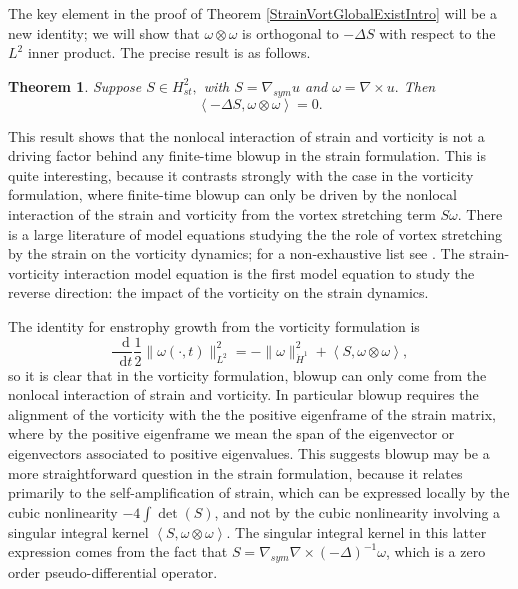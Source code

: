 \documentclass[11pt]{article}
\theoremstyle{plain}
\newtheorem{theorem}{Theorem}[section]
\theoremstyle{remark}
\numberwithin{equation}{section}
\newcommand{\diff}{\mathop{}\!\mathrm{d}}
\begin{document}
The key element in the proof of 
Theorem \ref{StrainVortGlobalExistIntro} will be a new identity; we will show that $\omega\otimes\omega$ is orthogonal to 
$-\Delta S$ with respect to the $L^2$ inner product. The precise result is as follows.
\begin{theorem} \label{StrainVortOrthogonalityIntro}
Suppose $S\in H^2_{st},$ with $S=\nabla_{sym}u$ and $\omega =\nabla \times u.$ Then
\begin{equation}
    \left<-\Delta S, \omega \otimes \omega\right>=0.
\end{equation}
\end{theorem}

This result shows that the nonlocal interaction of strain and vorticity is not a driving factor behind any finite-time blowup in the strain formulation. This is quite interesting, because it contrasts strongly with the case in the vorticity formulation, where finite-time blowup can only be driven by the nonlocal interaction of the strain and vorticity from the vortex stretching term $S\omega$. 
There is a large literature of model equations studying the the role of vortex stretching by the strain on the vorticity dynamics; for a non-exhaustive list see \cites{DeGregorio,ConstantinLaxMajda,Hou2018,HouEtAl,HouLei,JiaStewartSverak,ElgindiJeong,EGM,HQWW}.
The strain-vorticity interaction model equation is the first model equation to study the reverse direction: the impact of the vorticity on the strain dynamics.


The identity for enstrophy growth from the vorticity formulation is
\begin{equation}
    \frac{\diff}{\diff t}
    \frac{1}{2} \|\omega(\cdot,t)\|_{L^2}^2
    =-\|\omega\|_{\dot{H}^1}^2
    +\left<S,\omega\otimes\omega\right>,
\end{equation}
so it is clear that in the vorticity formulation, blowup can only come from the nonlocal interaction of strain and vorticity.
In particular blowup requires the alignment of the vorticity with the the positive eigenframe of the strain matrix, where by the positive eigenframe we mean the span of the eigenvector or eigenvectors associated to positive eigenvalues.
This suggests blowup may be a more straightforward question in the strain formulation, because it relates primarily to the self-amplification of strain, which can be expressed locally by the cubic nonlinearity $-4\int\det(S)$, and not by the cubic nonlinearity involving a singular integral kernel
$\left<S,\omega\otimes\omega\right>$. The singular integral kernel in this latter expression comes from the fact that 
$S=\nabla_{sym}\nabla\times(-\Delta)^{-1}\omega$, which is a zero order pseudo-differential operator.
\end{document}
